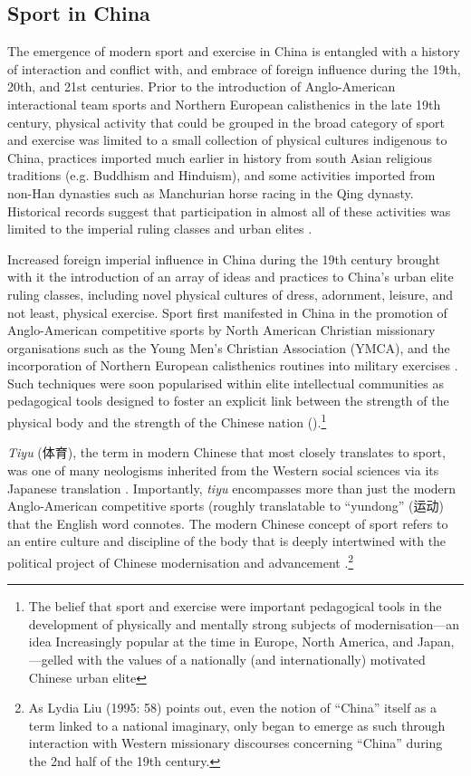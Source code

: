 \begin{CJK}{UTF8}{gbsn}
\subsection{Sport in China}
The emergence of modern sport and exercise in China is entangled with a history of interaction and conflict with, and embrace of foreign influence during the 19th, 20th, and 21st centuries.
Prior to the introduction of Anglo-American interactional team sports and Northern European calisthenics in the late 19th century, physical activity that could be grouped in the broad category of sport and exercise was limited to a small collection of physical cultures indigenous to China, practices imported much earlier in history from south Asian religious traditions (e.g. Buddhism and Hinduism), and some activities imported from non-Han dynasties such as Manchurian horse racing in the Qing dynasty.  Historical records suggest that participation in almost all of these activities was limited to the imperial ruling classes and urban elites \citep{Ge2005}.

Increased foreign imperial influence in China during the 19th century brought with it the introduction of an array of ideas and practices to China's urban elite ruling classes, including novel physical cultures of dress, adornment, leisure, and not least, physical exercise.  Sport first manifested in China in the promotion of Anglo-American competitive sports by North American Christian missionary organisations such as the Young Men's Christian Association (YMCA), and the incorporation of Northern European calisthenics routines into military exercises \citep[240]{Morris2004}.  Such techniques were soon popularised within elite intellectual communities as pedagogical tools designed to foster an explicit link between the strength of the physical body and the strength of the Chinese nation (\cites[32]{Morris2004}[49]{Brownell1995}).\footnote{The belief that sport and exercise were important pedagogical tools in the development of physically and mentally strong subjects of modernisation---an idea Increasingly popular at the time in Europe, North America, and Japan, \citep{Elias1986}---gelled with the values of a nationally (and internationally) motivated Chinese urban elite}

\textit{Tiyu} (体育), the term in modern Chinese that most closely translates to sport, was one of many neologisms inherited from the Western social sciences via its Japanese translation \citep{Morris1998}.  Importantly, \textit{tiyu} encompasses more than just the modern Anglo-American competitive sports (roughly translatable to ``yundong'' (运动) that the English word connotes.  The modern Chinese concept of sport refers to an entire culture and discipline of the body that is deeply intertwined with the political project of Chinese modernisation and advancement \citep{Morris2004}.\footnote{As Lydia Liu (1995: 58) points out, even the notion of ``China'' itself as a term linked to a national imaginary, only began to emerge as such through interaction with Western missionary discourses concerning ``China'' during the 2nd half of the 19th century.}


\end{CJK}
